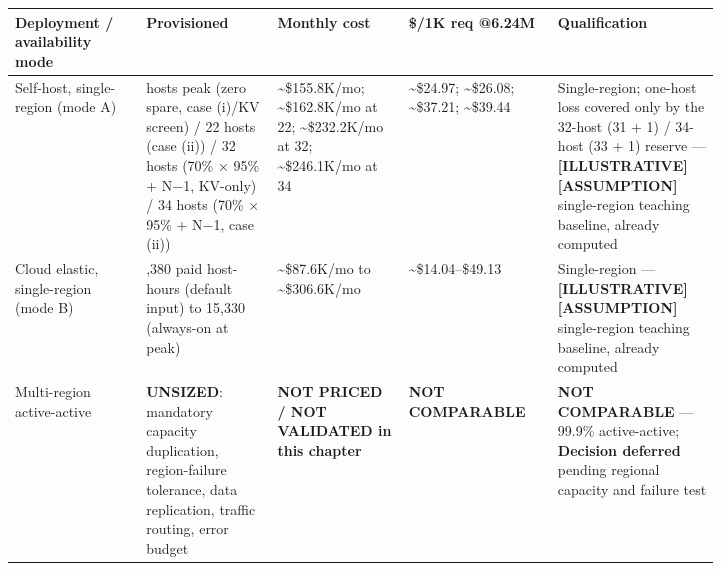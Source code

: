 \nopagebreak[4]
\begin{longtable}[]{@{}
  >{\raggedright\arraybackslash}p{0.1647\linewidth}
  >{\raggedright\arraybackslash}p{0.1647\linewidth}
  >{\raggedright\arraybackslash}p{0.1647\linewidth}
  >{\raggedright\arraybackslash}p{0.1647\linewidth}
  >{\raggedright\arraybackslash}p{0.1647\linewidth}@{}}
\toprule\noalign{}
\begin{minipage}[b]{\linewidth}\raggedright
Deployment / availability mode
\end{minipage} & \begin{minipage}[b]{\linewidth}\raggedright
Provisioned
\end{minipage} & \begin{minipage}[b]{\linewidth}\raggedright
Monthly cost
\end{minipage} & \begin{minipage}[b]{\linewidth}\raggedright
\$/1K req @6.24M
\end{minipage} & \begin{minipage}[b]{\linewidth}\raggedright
Qualification
\end{minipage} \\
\midrule\noalign{}
\endhead
\bottomrule\noalign{}
\endlastfoot
Self-host, single-region (mode A) & 21 hosts peak (zero spare, case
(i)/KV screen) / 22 hosts (case (ii)) / 32 hosts (70\% × 95\% + N−1,
KV-only) / 34 hosts (70\% × 95\% + N−1, case (ii)) &
\textasciitilde\$155.8K/mo; \textasciitilde\$162.8K/mo at 22;
\textasciitilde\$232.2K/mo at 32; \textasciitilde\$246.1K/mo at 34 &
\textasciitilde\$24.97; \textasciitilde\$26.08; \textasciitilde\$37.21;
\textasciitilde\$39.44 & Single-region; one-host loss covered only by
the 32-host (31 + 1) / 34-host (33 + 1) reserve ---
\textbf{\mbox{{[}ILLUSTRATIVE{]}}\hspace{0pt}\mbox{{[}ASSUMPTION{]}}} single-region teaching
baseline, already computed \\
\noalign{\label{tab:16.2}}
Cloud elastic, single-region (mode B) & 4,380 paid host-hours (default
input) to 15,330 (always-on at peak) & \textasciitilde\$87.6K/mo to
\textasciitilde\$306.6K/mo & \textasciitilde\$14.04--\$49.13 &
Single-region --- \textbf{\mbox{{[}ILLUSTRATIVE{]}}\hspace{0pt}\mbox{{[}ASSUMPTION{]}}}
single-region teaching baseline, already computed \\
Multi-region active-active & \textbf{UNSIZED}: mandatory capacity
duplication, region-failure tolerance, data replication, traffic
routing, error budget & \textbf{NOT PRICED / NOT VALIDATED in this
chapter} & \textbf{NOT COMPARABLE} & \textbf{NOT COMPARABLE} --- 99.9\%
active-active; \textbf{Decision deferred} pending regional capacity and
failure test \\
\end{longtable}

